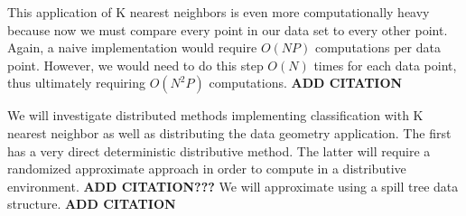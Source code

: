 \vspace{5 mm}
\noindent
This application of K nearest neighbors is even more computationally heavy 
because now we must compare every point in our data set to every other point. 
Again, a naive implementation would require $O(NP)$ computations per data 
point. However, we would need to do this step $O(N)$ times for each data point, 
thus ultimately requiring $O(N^{2}P)$ computations.
\textbf{ADD CITATION}

\vspace{5 mm}
\noindent
We will investigate distributed methods implementing classification with 
K nearest neighbor as well as distributing the data geometry application. The 
first has a very direct deterministic distributive method. The latter will 
require a randomized approximate approach in order to compute in a distributive 
environment.
\textbf{ADD CITATION???} 
We will approximate using a spill tree data structure.
\textbf{ADD CITATION}